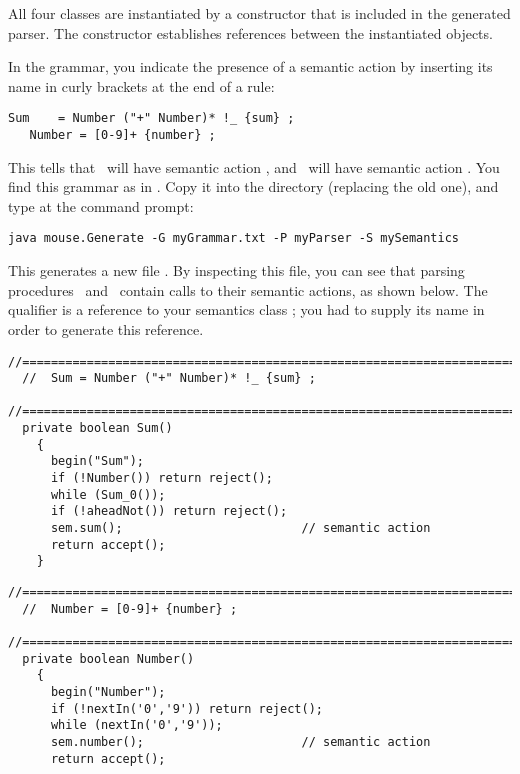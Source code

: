 All four classes are instantiated by a constructor
that is included in the generated parser.
The constructor establishes references between the
instantiated objects.

In the grammar, you indicate the presence of a semantic action by inserting its name in curly brackets
at the end of a rule:

\smallskip 
\small
\begin{Verbatim}[frame=single,framesep=2mm,samepage=true,xleftmargin=15mm,xrightmargin=15mm,baselinestretch=0.8]
   Sum    = Number ("+" Number)* !_ {sum} ;
   Number = [0-9]+ {number} ;
\end{Verbatim}
\normalsize
 
This tells that \Sum\ will have semantic action \Suma,
and \Number\ will have semantic action \Numbera.
You find this grammar as  in .
Copy it into the  directory (replacing the old one),
and type at the command prompt:

\small
\begin{Verbatim}[samepage=true,xleftmargin=15mm,baselinestretch=0.8]
 java mouse.Generate -G myGrammar.txt -P myParser -S mySemantics
\end{Verbatim}
\normalsize

This generates a new file .
By inspecting this file,
you can see that parsing procedures \Sumb\
and \Numberb\ contain calls to their semantic actions, as shown below.
The qualifier \tx{sem} is a reference to your semantics class ;
you had to supply its name in order to generate this reference.

\small
\begin{Verbatim}[frame=single,framesep=2mm,samepage=true,xleftmargin=15mm,xrightmargin=15mm,baselinestretch=0.8]
  //=====================================================================
  //  Sum = Number ("+" Number)* !_ {sum} ;
  //=====================================================================
  private boolean Sum()
    {
      begin("Sum");
      if (!Number()) return reject();
      while (Sum_0());
      if (!aheadNot()) return reject();
      sem.sum();                         // semantic action
      return accept();
    }
\end{Verbatim}
\normalsize

\small
\begin{Verbatim}[frame=single,framesep=2mm,samepage=true,xleftmargin=15mm,xrightmargin=15mm,baselinestretch=0.8]
  //=====================================================================
  //  Number = [0-9]+ {number} ;
  //=====================================================================
  private boolean Number()
    {
      begin("Number");
      if (!nextIn('0','9')) return reject();
      while (nextIn('0','9'));
      sem.number();                      // semantic action
      return accept();
\end{Verbatim}
\normalsize

